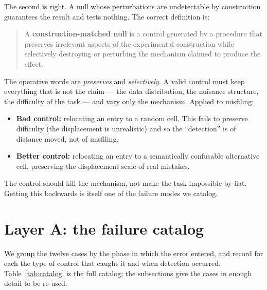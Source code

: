 \documentclass[11pt]{article}
\begin{document}
The second is right. A null whose perturbations are undetectable by
construction guarantees the result and tests nothing. The correct
definition is:

\begin{quote}
A \textbf{construction-matched null} is a control generated by a procedure
that preserves irrelevant aspects of the experimental construction while
selectively destroying or perturbing the mechanism claimed to produce the
effect.
\end{quote}

The operative words are \emph{preserves} and \emph{selectively}. A valid
control must keep everything that is not the claim --- the data
distribution, the nuisance structure, the difficulty of the task --- and
vary only the mechanism. Applied to misfiling:

\begin{itemize}
\item \textbf{Bad control:} relocating an entry to a random cell. This
  fails to preserve difficulty (the displacement is unrealistic) and so the
  ``detection'' is of distance moved, not of misfiling.
\item \textbf{Better control:} relocating an entry to a semantically
  confusable alternative cell, preserving the displacement scale of real
  mistakes.
\end{itemize}

The control should kill the mechanism, not make the task impossible by
fiat. Getting this backwards is itself one of the failure modes we
catalog.

\section{Layer A: the failure catalog}
\label{sec:catalog}

We group the twelve cases by the phase in which the error entered, and
record for each the type of control that caught it and when detection
occurred. Table~\ref{tab:catalog} is the full catalog; the subsections give
the cases in enough detail to be re-used.
\end{document}
